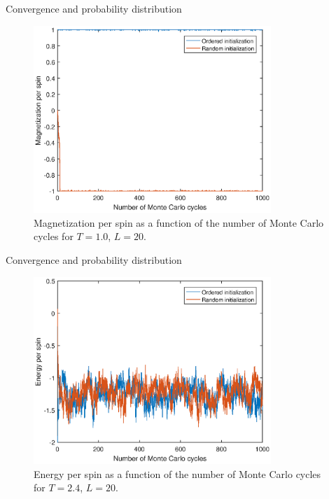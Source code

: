 \documentclass{beamer}
\begin{document}
\begin{frame}{Convergence and probability distribution}
\begin{figure}
	\includegraphics[width=0.8\textwidth]{Process_mag_lowT.eps}
	\caption{Magnetization per spin as a function of the number of Monte Carlo cycles for $T=1.0$, $L=20$. }
\end{figure}
\end{frame}

\begin{frame}{Convergence and probability distribution}
\begin{figure}
	\includegraphics[width=0.8\textwidth]{Process_ene_highT.eps}
	\caption{Energy per spin as a function of the number of Monte Carlo cycles for $T=2.4$, $L=20$. }
\end{figure}
\end{frame}
\end{document}
